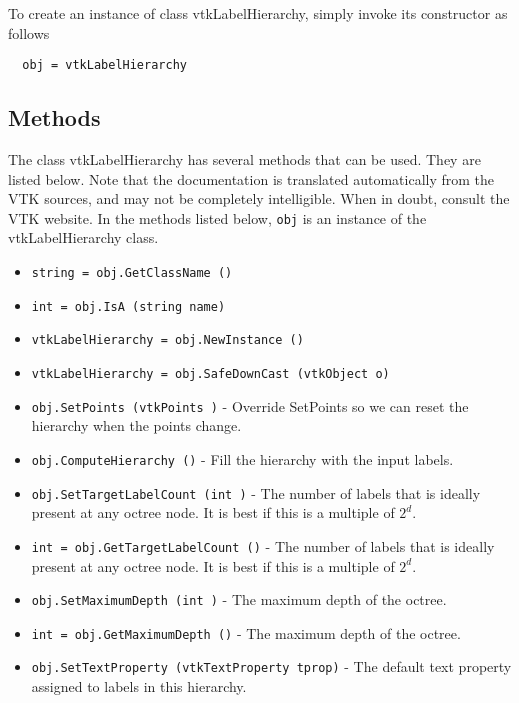 To create an instance of class vtkLabelHierarchy, simply
invoke its constructor as follows
\begin{verbatim}
  obj = vtkLabelHierarchy
\end{verbatim}
\subsection{Methods}

The class vtkLabelHierarchy has several methods that can be used.
  They are listed below.
Note that the documentation is translated automatically from the VTK sources,
and may not be completely intelligible.  When in doubt, consult the VTK website.
In the methods listed below, \verb|obj| is an instance of the vtkLabelHierarchy class.
\begin{itemize}
\item  \verb|string = obj.GetClassName ()|

\item  \verb|int = obj.IsA (string name)|

\item  \verb|vtkLabelHierarchy = obj.NewInstance ()|

\item  \verb|vtkLabelHierarchy = obj.SafeDownCast (vtkObject o)|

\item  \verb|obj.SetPoints (vtkPoints )| -  Override SetPoints so we can reset the hierarchy when the points change.

\item  \verb|obj.ComputeHierarchy ()| -  Fill the hierarchy with the input labels.

\item  \verb|obj.SetTargetLabelCount (int )| -  The number of labels that is ideally present at any octree node.
 It is best if this is a multiple of $2^d$.

\item  \verb|int = obj.GetTargetLabelCount ()| -  The number of labels that is ideally present at any octree node.
 It is best if this is a multiple of $2^d$.

\item  \verb|obj.SetMaximumDepth (int )| -  The maximum depth of the octree.

\item  \verb|int = obj.GetMaximumDepth ()| -  The maximum depth of the octree.

\item  \verb|obj.SetTextProperty (vtkTextProperty tprop)| -  The default text property assigned to labels in this hierarchy.


\end{itemize}
